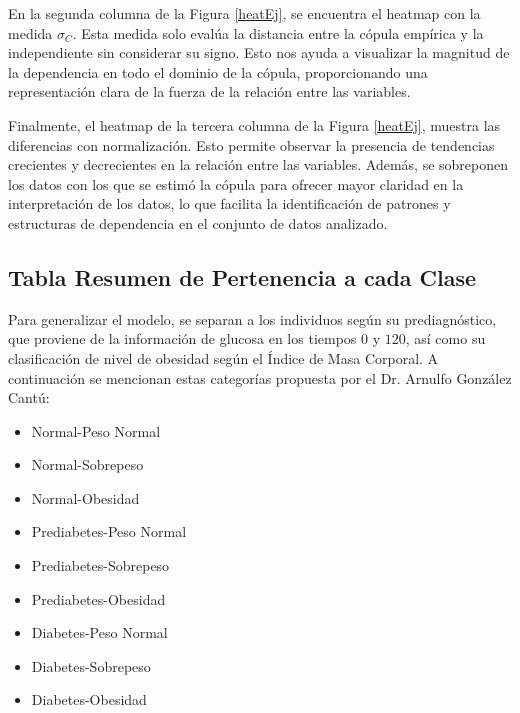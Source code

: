 En la segunda columna de la Figura \ref{heatEj}, se encuentra el heatmap con la medida $\sigma_C$. Esta medida solo evalúa la distancia entre la cópula empírica y la independiente sin considerar su signo. Esto nos ayuda a visualizar la magnitud de la dependencia en todo el dominio de la cópula, proporcionando una representación clara de la fuerza de la relación entre las variables.

Finalmente, el heatmap de la tercera columna de la Figura \ref{heatEj}, muestra las diferencias con normalización. Esto permite observar la presencia de tendencias crecientes y decrecientes en la relación entre las variables. Además, se sobreponen los datos con los que se estimó la cópula para ofrecer mayor claridad en la interpretación de los datos, lo que facilita la identificación de patrones y estructuras de dependencia en el conjunto de datos analizado.


\subsection{Tabla Resumen de Pertenencia a cada Clase}\label{subTabla}

Para generalizar el modelo, se separan a los individuos según su prediagnóstico, que proviene de la información de glucosa en los tiempos $0$ y $120$, así como su clasificación de nivel de obesidad según el Índice de Masa Corporal. A continuación se mencionan estas categorías propuesta por el Dr. Arnulfo González Cantú:

\begin{multicols}{2}
    \begin{itemize}
        \item Normal-Peso Normal
        \item Normal-Sobrepeso
        \item Normal-Obesidad	
        \item Prediabetes-Peso Normal
        \item Prediabetes-Sobrepeso
        \item Prediabetes-Obesidad	
        \item Diabetes-Peso Normal	
        \item Diabetes-Sobrepeso
        \item Diabetes-Obesidad
    \end{itemize}
\end{multicols}

